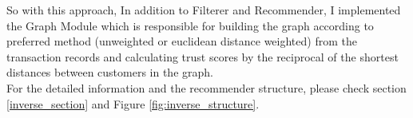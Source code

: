 So with this approach, In addition to Filterer and Recommender, I implemented the Graph Module which is responsible for building the graph according to preferred method (unweighted or euclidean distance weighted) from the transaction records and calculating trust scores  by the reciprocal of the shortest distances between customers in the graph. \\

For the detailed information and the recommender structure, please check section \ref{inverse_section} and Figure \ref{fig:inverse_structure}.